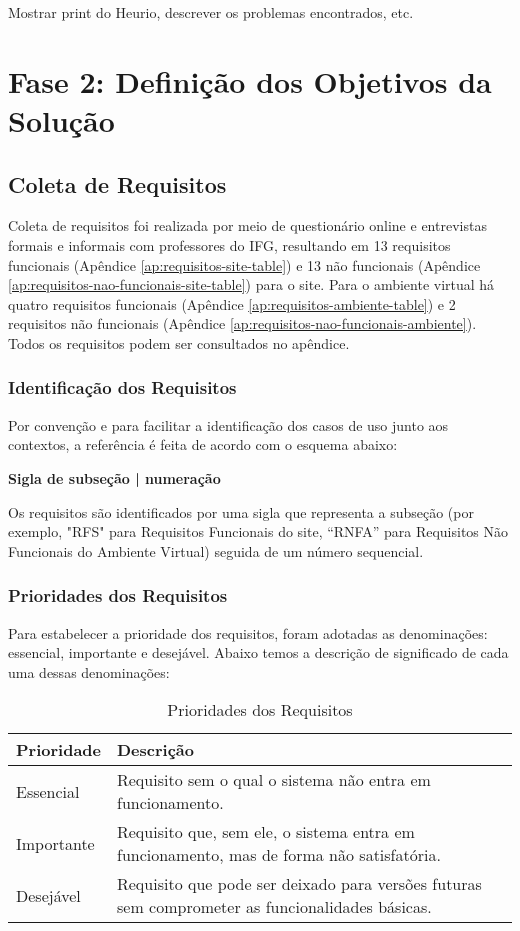 Mostrar print do Heurio, descrever os problemas encontrados, etc.

\section{Fase 2: Definição dos Objetivos da Solução}\label{definicao_dos_objetivos_da_solucao}
\subsection{Coleta de Requisitos}
Coleta de requisitos foi realizada por meio de questionário online e entrevistas formais e informais com professores do IFG, resultando em 13 requisitos funcionais (Apêndice \ref{ap:requisitos-site-table}) e 13 não funcionais (Apêndice \ref{ap:requisitos-nao-funcionais-site-table}) para o site. Para o ambiente virtual há quatro requisitos funcionais (Apêndice \ref{ap:requisitos-ambiente-table}) e 2 requisitos não funcionais (Apêndice \ref{ap:requisitos-nao-funcionais-ambiente}). Todos os requisitos podem ser consultados no apêndice. 

\subsubsection{Identificação dos Requisitos}
\label{sec:identificacao_requisitos}

Por convenção e para facilitar a identificação dos casos de uso junto aos contextos, a referência é feita de acordo com o esquema abaixo:

\textbf{Sigla de subseção | numeração}

Os requisitos são identificados por uma sigla que representa a subseção (por exemplo, "RFS" para Requisitos Funcionais do site, “RNFA” para Requisitos Não Funcionais do Ambiente Virtual) seguida de um número sequencial.

\subsubsection{Prioridades dos Requisitos}
\label{sec:prioridades_requisitos}

Para estabelecer a prioridade dos requisitos, foram adotadas as denominações: essencial, importante e desejável. Abaixo temos a descrição de significado de cada uma dessas denominações:

\begin{table}[H]
\centering
\caption{Prioridades dos Requisitos}
\label{tab:prioridades_requisitos}
\begin{tabular}{|l|p{10cm}|}
\hline
\textbf{Prioridade} & \textbf{Descrição} \\ \hline
Essencial & Requisito sem o qual o sistema não entra em funcionamento. \\ \hline
Importante & Requisito que, sem ele, o sistema entra em funcionamento, mas de forma não satisfatória. \\ \hline
Desejável & Requisito que pode ser deixado para versões futuras sem comprometer as funcionalidades básicas. \\ \hline
\end{tabular}
\end{table}

